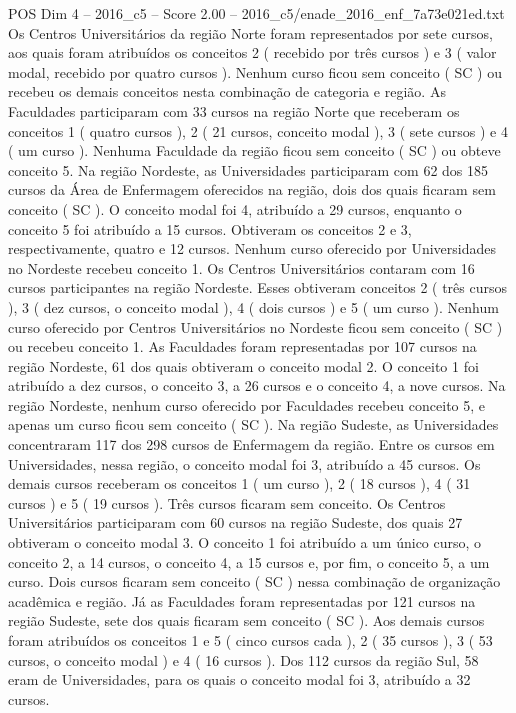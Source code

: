 \begin{textsample}{POS Dim 4 – 2016\_c5 – Score 2.00 – 2016\_c5/enade\_2016\_enf\_7a73e021ed.txt}
Os Centros Universitários da região Norte foram representados por sete cursos, aos quais foram atribuídos os conceitos 2 ( recebido por três cursos ) e 3 ( valor modal, recebido por quatro cursos ).
Nenhum curso ficou sem conceito ( SC ) ou recebeu os demais conceitos nesta combinação de categoria e região.
As Faculdades participaram com 33 cursos na região Norte que receberam os conceitos 1 ( quatro cursos ), 2 ( 21 cursos, conceito modal ), 3 ( sete cursos ) e 4 ( um curso ).
Nenhuma Faculdade da região ficou sem conceito ( SC ) ou obteve conceito 5.
Na região Nordeste, as Universidades participaram com 62 dos 185 cursos da Área de Enfermagem oferecidos na região, dois dos quais ficaram sem conceito ( SC ).
O conceito modal foi 4, atribuído a 29 cursos, enquanto o conceito 5 foi atribuído a 15 cursos.
Obtiveram os conceitos 2 e 3, respectivamente, quatro e 12 cursos.
Nenhum curso oferecido por Universidades no Nordeste recebeu conceito 1.
Os Centros Universitários contaram com 16 cursos participantes na região Nordeste.
Esses obtiveram conceitos 2 ( três cursos ), 3 ( dez cursos, o conceito modal ), 4 ( dois cursos ) e 5 ( um curso ).
Nenhum curso oferecido por Centros Universitários no Nordeste ficou sem conceito ( SC ) ou recebeu conceito 1.
As Faculdades foram representadas por 107 cursos na região Nordeste, 61 dos quais obtiveram o conceito modal 2.
O conceito 1 foi atribuído a dez cursos, o conceito 3, a 26 cursos e o conceito 4, a nove cursos.
Na região Nordeste, nenhum curso oferecido por Faculdades recebeu conceito 5, e apenas um curso ficou sem conceito ( SC ).
Na região Sudeste, as Universidades concentraram 117 dos 298 cursos de Enfermagem da região.
Entre os cursos em Universidades, nessa região, o conceito modal foi 3, atribuído a 45 cursos.
Os demais cursos receberam os conceitos 1 ( um curso ), 2 ( 18 cursos ), 4 ( 31 cursos ) e 5 ( 19 cursos ).
Três cursos ficaram sem conceito.
Os Centros Universitários participaram com 60 cursos na região Sudeste, dos quais 27 obtiveram o conceito modal 3.
O conceito 1 foi atribuído a um único curso, o conceito 2, a 14 cursos, o conceito 4, a 15 cursos e, por fim, o conceito 5, a um curso.
Dois cursos ficaram sem conceito ( SC ) nessa combinação de organização acadêmica e região.
Já as Faculdades foram representadas por 121 cursos na região Sudeste, sete dos quais ficaram sem conceito ( SC ).
Aos demais cursos foram atribuídos os conceitos 1 e 5 ( cinco cursos cada ), 2 ( 35 cursos ), 3 ( 53 cursos, o conceito modal ) e 4 ( 16 cursos ).
Dos 112 cursos da região Sul, 58 eram de Universidades, para os quais o conceito modal foi 3, atribuído a 32 cursos.

\end{textsample}
